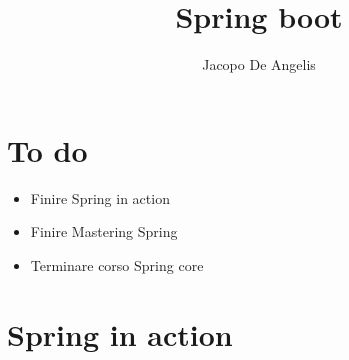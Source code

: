 \documentclass[11pt,a4paper]{book}
\begin{document}
\title{Spring boot}
\author{Jacopo De Angelis}
\maketitle

\pagebreak
\tableofcontents
\pagebreak
\chapter*{To do}
\begin{itemize}
	\item Finire Spring in action
	\item Finire Mastering Spring
	\item Terminare corso Spring core
\end{itemize}
\chapter{Spring in action}\label{par: SpringAction}
\end{document}
